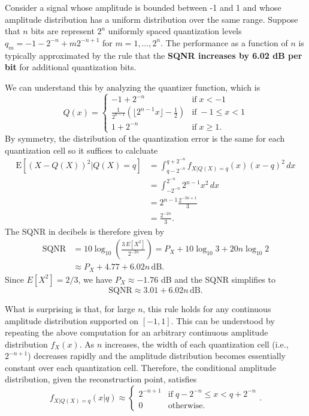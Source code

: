 \begin{example}
Consider a signal whose amplitude is bounded between -1 and 1 and whose amplitude distribution has a uniform distribution over the same range.
Suppose that $n$ bits are represent $2^n$ uniformly spaced quantization levels $q_m = -1-2^{-n} + m 2^{-n+1}$ for $m=1,\ldots,2^n$.
The performance as a function of $n$ is typically approximated by the rule that the \textbf{SQNR increases by 6.02 dB per bit} for additional quantization bits.

We can understand this by analyzing the quantizer function, which is
\[ Q(x) =
\begin{cases}
-1+2^{-n} & \mathrm{if} \; x < -1 \\
\frac{1}{2^{n-1}} \left( \lfloor 2^{n-1} x \rfloor - \frac{1}{2} \right) & \mathrm{if} \; - 1 \leq x < 1 \\
1+2^{-n} & \mathrm{if} \; x \geq 1.
\end{cases}
\]
By symmetry, the distribution of the quantization error is the same for each quantization cell so it suffices to calcluate
\begin{align*}
\mathrm{E} \left[ \left( X - Q(X) \right)^2 \big| Q(X)=q \right]
&= \int_{q-2^{-n}}^{q+2^{-n}} f_{X|Q(X)=q} (x) (x-q)^2 \, dx \\
&= \int_{-2^{-n}}^{2^{-n}} 2^{n-1} x^2 \, dx \\
&= 2^{n-1} \frac{2^{-3n+1}}{3} \\
&= \frac{2^{-2n}}{3}.
\end{align*}
The SQNR in decibels is therefore given by
\begin{align*}
\text{SQNR} &= 10 \log_{10} \left( \frac{3\,E[X^2]}{2^{-2n}} \right)
= P_X + 10 \log_{10} 3 + 20n \log_{10} 2 \\
& \approx P_X + 4.77 + 6.02 n \, \text{dB}.
\end{align*}
Since $E[X^2] = 2/3$, we have $P_X \approx -1.76$ dB and the SQNR simplifies to
\[ \text{SQNR} \approx 3.01 + 6.02 n \, \text{dB}. \]
\end{example}

What is surprising is that, for large $n$, this rule holds for any continuous amplitude distribution supported on $[-1,1]$.
This can be understood by repeating the above computation for an arbitrary continuous amplitude distribution $f_X (x)$.
As $n$ increases, the width of each quantization cell (i.e., $2^{-n+1}$) decreases rapidly and the amplitude distribution becomes essentially constant over each quantization cell.
Therefore, the conditional amplitude distribution, given the reconstruction point, satisfies
\[ f_{X|Q(X)=q} (x|q) \approx \begin{cases} 2^{-n+1} & \mathrm{if}\; q-2^{-n} \leq x < q+2^{-n} \\ 0 & \mathrm{otherwise.} \end{cases}. \]

